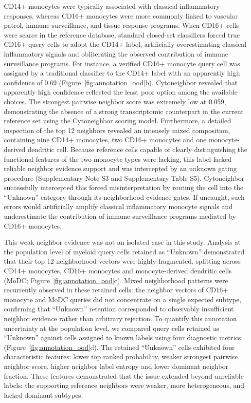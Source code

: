 \documentclass[11pt]{article}
\begin{document}
CD14+ monocytes were typically associated with classical inflammatory responses, whereas CD16+ monocytes were more commonly linked to vascular patrol, immune surveillance, and tissue response programs. When CD16+ cells were scarce in the reference database, standard closed-set classifiers forced true CD16+ query cells to adopt the CD14+ label, artificially overestimating classical inflammatory signals and obliterating the observed contribution of immune surveillance programs. For instance, a verified CD16+ monocyte query cell was assigned by a traditional classifier to the CD14+ label with an apparently high confidence of 0.69 (Figure~\ref{fig:annotation_ood}b). Cytoneighbor revealed that apparently high confidence reflected the least poor option among the available choices. The strongest pairwise neighbor score was extremely low at 0.059, demonstrating the absence of a strong transcriptomic counterpart in the current reference set using the Cytoneighbor scoring model. Furthermore, a detailed inspection of the top 12 neighbors revealed an intensely mixed composition, containing nine CD14+ monocytes, two CD16+ monocytes and one monocyte-derived dendritic cell. Because reference cells capable of clearly distinguishing the functional features of the two monocyte types were lacking, this label lacked reliable neighbor evidence support and was intercepted by an unknown gating procedure (Supplementary Note S3 and Supplementary Table S5). Cytoneighbor successfully intercepted this forced misinterpretation by routing the cell into the ``Unknown'' category through its neighborhood evidence gates. If uncaught, such errors would artificially amplify classical inflammatory monocyte signals and underestimate the contribution of immune surveillance programs mediated by CD16+ monocytes.

This weak neighbor evidence was not an isolated case in this study. Analysis at the population level of myeloid query cells retained as ``Unknown''\cite{Pasquini2021AnnotationReview} demonstrated that their top 12 neighborhood vectors were highly fragmented, splitting across CD14+ monocytes, CD16+ monocytes and monocyte-derived dendritic cells (MoDC; Figure~\ref{fig:annotation_ood}c). Mixed neighborhood patterns were recurrently observed in these retained cells: the neighbor vectors of CD16+ monocyte and MoDC queries did not concentrate on a single expected subtype, confirming that ``Unknown'' retention corresponded to observably insufficient neighbor evidence rather than arbitrary rejection. To quantify this annotation uncertainty at the population level, we compared query cells retained as ``Unknown'' against cells assigned to known labels using four diagnostic metrics (Figure~\ref{fig:annotation_ood}d). The retained ``Unknown'' cells exhibited four characteristic features: lower top ranked probability, weaker strongest pairwise neighbor score, higher neighbor label entropy and lower dominant neighbor fraction. These features demonstrated that the issue extended beyond unreliable labels: the supporting reference neighbors were weaker, more heterogeneous, and lacked dominant subtypes.
\end{document}
